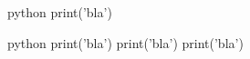 \begin{codeBlock}{python}
print('bla')
\end{codeBlock}

\begin{codeBlock}{python}
print('bla')
print('bla')
print('bla')
\end{codeBlock}
